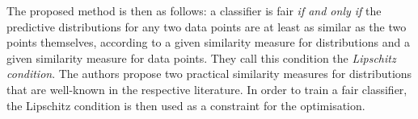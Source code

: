 The proposed method is then as follows: a classifier is fair
\emph{if and only if} the predictive distributions for any two data points
are at least as similar as the two points themselves,
according to a given similarity measure for distributions
and a given similarity measure for data points.
They call this condition the \emph{Lipschitz condition}.
The authors propose two practical similarity measures for distributions
that are well-known in the respective literature.
In order to train a fair classifier,
the Lipschitz condition is then used as a constraint for the optimisation.



